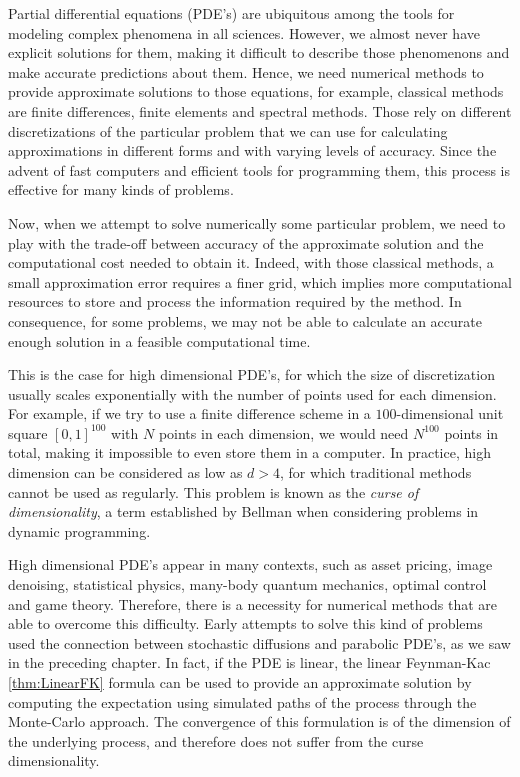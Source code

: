 Partial differential equations (PDE's) are ubiquitous among the tools for modeling complex phenomena in all sciences. However, we almost never have explicit solutions for them, making it difficult to describe those phenomenons and make accurate predictions about them. Hence, we need numerical methods to provide approximate solutions to those equations, for example, classical methods are finite differences, finite elements and spectral methods. Those rely on different discretizations of the particular problem that  we can use for calculating approximations in different forms and with varying levels of accuracy. Since the advent of fast computers and efficient tools for programming them, this process is effective for many kinds of problems.   

Now, when we attempt to solve numerically some particular problem, we need to play with the trade-off between accuracy of the approximate solution and the computational cost needed to obtain it. Indeed, with those classical methods, a small approximation error requires a finer grid, which implies more computational resources to store and process the information required by the method. In consequence, for some problems, we may not be able to calculate an accurate enough solution in a feasible computational time.

This is the case for high dimensional PDE's, for which the size of discretization usually scales exponentially with the number of points used for each dimension. For example, if we try to use a finite difference scheme in a $100$-dimensional unit square $[0,1]^{100}$ with $N$ points in each dimension, we would need $N^{100}$ points in total, making it impossible to even store them in a computer. In practice, high dimension can be considered as low as $d>4$, for which traditional methods cannot be used as regularly. This problem is known as the \textit{curse of dimensionality}, a term established by Bellman when considering problems in dynamic programming.

High dimensional PDE's appear in many contexts, such as asset pricing, image denoising, statistical physics, many-body quantum mechanics, optimal control and game theory. Therefore, there is a necessity for numerical methods that are able to overcome this difficulty. Early attempts to solve this kind of problems used the connection between stochastic diffusions and parabolic PDE's, as we saw in the preceding chapter. In fact, if the PDE is linear, the linear Feynman-Kac \ref{thm:LinearFK} formula can be used to provide an approximate solution by computing the expectation using simulated paths of the process through the  Monte-Carlo approach. The convergence of this formulation is  of the dimension of the underlying process, and therefore does not suffer from the curse dimensionality.


